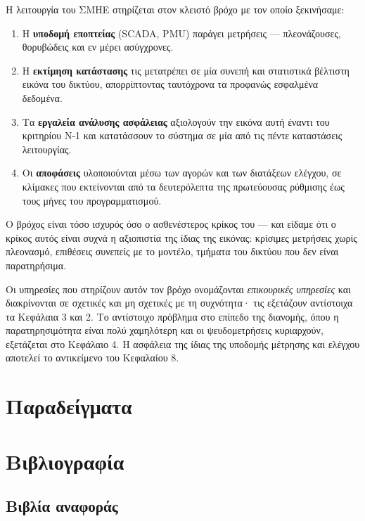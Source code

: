 Η λειτουργία του ΣΜΗΕ στηρίζεται στον κλειστό βρόχο με τον οποίο ξεκινήσαμε:

\begin{enumerate}
\item Η \textbf{υποδομή εποπτείας} (SCADA, PMU) παράγει μετρήσεις — πλεονάζουσες,
      θορυβώδεις και εν μέρει ασύγχρονες.
\item Η \textbf{εκτίμηση κατάστασης} τις μετατρέπει σε μία συνεπή και στατιστικά βέλτιστη
      εικόνα του δικτύου, απορρίπτοντας ταυτόχρονα τα προφανώς εσφαλμένα δεδομένα.
\item Τα \textbf{εργαλεία ανάλυσης ασφάλειας} αξιολογούν την εικόνα αυτή έναντι του
      κριτηρίου N-1 και κατατάσσουν το σύστημα σε μία από τις πέντε καταστάσεις λειτουργίας.
\item Οι \textbf{αποφάσεις} υλοποιούνται μέσω των αγορών και των διατάξεων ελέγχου, σε
      κλίμακες που εκτείνονται από τα δευτερόλεπτα της πρωτεύουσας ρύθμισης έως τους μήνες
      του προγραμματισμού.
\end{enumerate}

Ο βρόχος είναι τόσο ισχυρός όσο ο ασθενέστερος κρίκος του — και είδαμε ότι ο κρίκος αυτός
είναι συχνά η αξιοπιστία της ίδιας της εικόνας: κρίσιμες μετρήσεις χωρίς πλεονασμό,
επιθέσεις συνεπείς με το μοντέλο, τμήματα του δικτύου που δεν είναι παρατηρήσιμα.

Οι υπηρεσίες που στηρίζουν αυτόν τον βρόχο ονομάζονται \emph{επικουρικές υπηρεσίες} και
διακρίνονται σε σχετικές και μη σχετικές με τη συχνότητα· τις εξετάζουν αντίστοιχα τα
Κεφάλαια 3 και 2. Το αντίστοιχο πρόβλημα στο επίπεδο της διανομής, όπου η παρατηρησιμότητα
είναι πολύ χαμηλότερη και οι ψευδομετρήσεις κυριαρχούν, εξετάζεται στο Κεφάλαιο 4. Η
ασφάλεια της ίδιας της υποδομής μέτρησης και ελέγχου αποτελεί το αντικείμενο του
Κεφαλαίου 8.

\section{Παραδείγματα}
\label{kef-01-paradeigmata}

\section{Βιβλιογραφία}
\label{kef-01-vivliografia}

\subsection*{Βιβλία αναφοράς}

